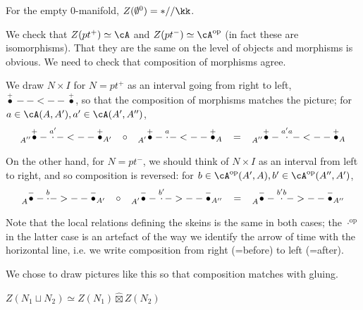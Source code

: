 \documentclass[12pt]{article}
\newcommand{\empt}[1]{{\emptyset^{#1}}}
\newcommand{\op}{{\text{op}}}
\newcommand{\hatbox}{{\hat{\boxtimes}}}
\begin{document}
For the empty 0-manifold, $Z(\empt{0}) = *//\kk$.

We check that
$Z(pt^+) \simeq \cA$ and $Z(pt^-) \simeq \cA^\op$
(in fact these are isomorphisms).
That they are the same on the level of objects
and morphisms is obvious.
We need to check that composition of morphisms agree.

We draw $N \times I$ for $N = pt^+$
as an interval going from right to left,
$\overset{+}{\bullet}--<--\overset{+}{\bullet}$,
so that the composition of morphisms matches the picture;
for $a \in \cA(A,A'), a' \in \cA(A',A'')$,
\[
\prescript{}{A''}{\overset{+}{\bullet}}-\overset{a'}{\cdot}-<--
\overset{+}{\bullet}_{A'}
\;\;\;
\circ
\;\;\;
\prescript{}{A'}{\overset{+}{\bullet}}-\overset{a}{\cdot}-<--
\overset{+}{\bullet}_{A}
\;\;\;
=
\;\;\;
\prescript{}{A''}{\overset{+}{\bullet}}-\overset{a'a}{\cdot}-<--
\overset{+}{\bullet}_{A}
\]

On the other hand, for $N = pt^-$,
we should think of $N \times I$ as an interval from left to right,
and so composition is reversed:
for $b \in \cA^\op(A',A), b' \in \cA^\op(A'',A')$,
\[
\prescript{}{A}{\overset{-}{\bullet}}-\overset{b}{\cdot}->--
\overset{-}{\bullet}_{A'}
\;\;\;
\circ
\;\;\;
\prescript{}{A'}{\overset{-}{\bullet}}-\overset{b'}{\cdot}->--
\overset{-}{\bullet}_{A''}
\;\;\;
=
\;\;\;
\prescript{}{A}{\overset{-}{\bullet}}-\overset{b'b}{\cdot}->--
\overset{-}{\bullet}_{A''}
\]


\begin{remark}
\label{r:arrow-of-time}
Note that the local relations defining the skeins is the same
in both cases; the $\cdot^\op$ in the latter case is an artefact of the
way we identify the arrow of time with the horizontal line,
i.e. we write composition from right (=before) to left (=after).

We chose to draw pictures like this
so that composition matches with gluing.
\end{remark}



\begin{proposition}
$Z(N_1 \sqcup N_2) \simeq Z(N_1) \hatbox Z(N_2)$
\end{proposition}
\end{document}
